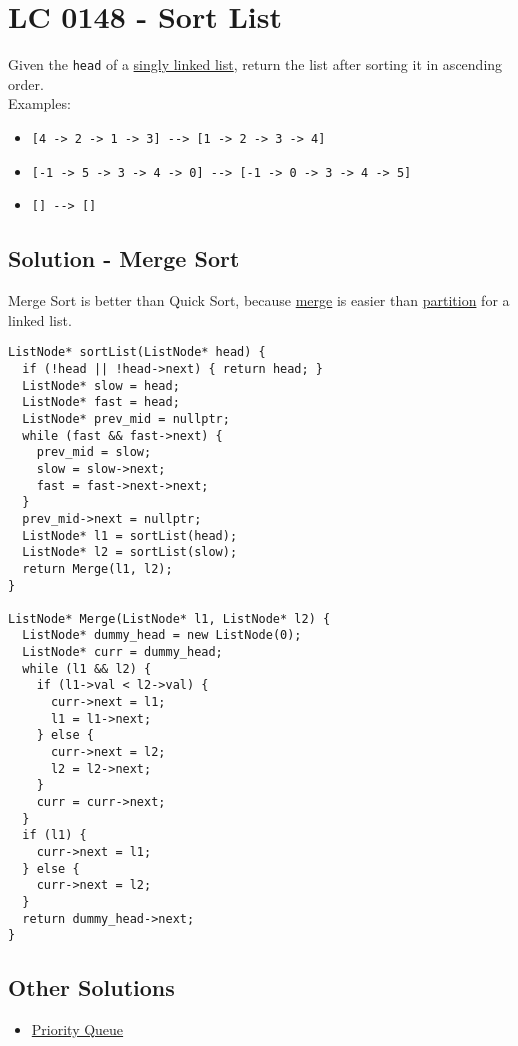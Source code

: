 \section{LC 0148 - Sort List}\label{lc0148}
Given the {\colorbox{CodeBackground}{\lstinline|head|}} of a \ul{singly linked list}, return the list after sorting it in ascending order.\\

Examples:
\begin{itemize}
\item {\colorbox{CodeBackground}{\lstinline|[4 -> 2 -> 1 -> 3] --> [1 -> 2 -> 3 -> 4]|}}
\item {\colorbox{CodeBackground}{\lstinline|[-1 -> 5 -> 3 -> 4 -> 0] --> [-1 -> 0 -> 3 -> 4 -> 5]|}}
\item {\colorbox{CodeBackground}{\lstinline|[] --> []|}}
\end{itemize}

\subsection*{Solution - Merge Sort}\label{solution:lc0148_merge_sort}
Merge Sort is better than Quick Sort, because \ul{merge} is easier than \ul{partition} for a linked list.
\begin{lstlisting}
ListNode* sortList(ListNode* head) {
  if (!head || !head->next) { return head; }
  ListNode* slow = head;
  ListNode* fast = head;
  ListNode* prev_mid = nullptr;
  while (fast && fast->next) {
    prev_mid = slow;
    slow = slow->next;
    fast = fast->next->next;
  }
  prev_mid->next = nullptr;
  ListNode* l1 = sortList(head);
  ListNode* l2 = sortList(slow);
  return Merge(l1, l2);
}

ListNode* Merge(ListNode* l1, ListNode* l2) {
  ListNode* dummy_head = new ListNode(0);
  ListNode* curr = dummy_head;
  while (l1 && l2) {
    if (l1->val < l2->val) {
      curr->next = l1;
      l1 = l1->next;
    } else {
      curr->next = l2;
      l2 = l2->next;
    }
    curr = curr->next;
  }
  if (l1) {
    curr->next = l1;
  } else {
    curr->next = l2;
  }
  return dummy_head->next;
}
\end{lstlisting}

\subsection*{Other Solutions}
\begin{itemize}
\item \hyperref[solution:lc-148_priority_queue]{Priority Queue}
\end{itemize}

